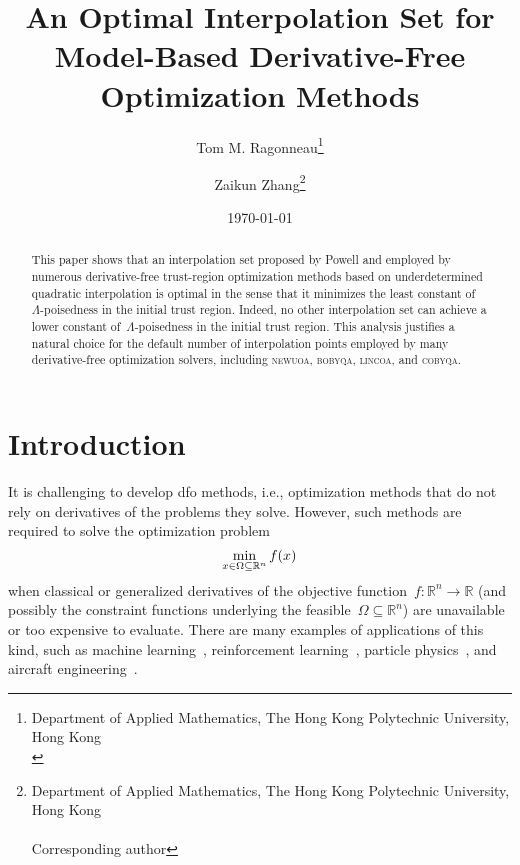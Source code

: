 \documentclass{article}
\title{An Optimal Interpolation Set for Model-Based Derivative-Free Optimization Methods}
\author{
    Tom M. Ragonneau\thanks{
        Department of Applied Mathematics, The Hong Kong Polytechnic University, Hong Kong\\
        \email{tom.ragonneau@polyu.edu.hk} \quad \website[globe-asia]{www.tomragonneau.com} \quad \linkedin{tom-m-ragonneau-11958a12b}
    }\orcid{0000-0003-2717-2876} \and
    Zaikun Zhang\thanks{
        Department of Applied Mathematics, The Hong Kong Polytechnic University, Hong Kong\\
        \email{zaikun.zhang@polyu.edu.hk} \quad \website[globe-asia]{www.zhangzk.net}\\
        Corresponding author
    }\orcid{0000-0001-8934-8190}
}
\date{\today}
\numberwithin{equation}{section}
\theoremstyle{definition}
\theoremstyle{plain}
\theoremstyle{remark}
\newcommand*{\fset}{\Omega}
\newcommand*{\obj}{f}
\newcommand*{\R}{\mathbb{R}}
\newcommand*{\solvername}[1]{\textsc{#1}\xspace}
\begin{document}
\maketitle

\begin{abstract}
    This paper shows that an interpolation set proposed by Powell and employed by numerous derivative-free trust-region optimization methods based on underdetermined quadratic interpolation is optimal in the sense that it minimizes the least constant of~$\Lambda$-poisedness in the initial trust region.
    Indeed, no other interpolation set can achieve a lower constant of~$\Lambda$-poisedness in the initial trust region.
    This analysis justifies a natural choice for the default number of interpolation points employed by many derivative-free optimization solvers, including \solvername{newuoa}, \solvername{bobyqa}, \solvername{lincoa}, and \solvername{cobyqa}.
\end{abstract}



\section{Introduction}

It is challenging to develop \gls{dfo} methods, i.e., optimization methods that do not rely on derivatives of the problems they solve.
However, such methods are required to solve the optimization problem
\begin{equation}
    \label{eq:nlp}
    \min_{x \in \fset \subseteq \R^n} \obj(x)\\
\end{equation}
when classical or generalized derivatives of the objective function~$\obj \colon \R^n \to \R$ (and possibly the constraint functions underlying the feasible~$\fset \subseteq \R^n$) are unavailable or too expensive to evaluate.
There are many examples of applications of this kind, such as machine learning~\cite{Ghanbari_Scheinberg_2017}, reinforcement learning~\cite{Qian_Yu_2021}, particle physics~\cite{Eldred_Etal_2022}, and aircraft engineering~\cite{Gazaix_Etal_2019}.
\end{document}

